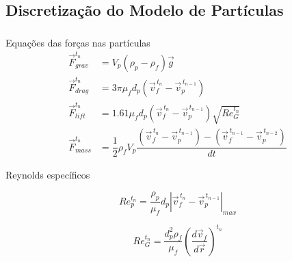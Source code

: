 \documentclass{beamer}
\begin{document}
\subsection*{Discretização do Modelo de Partículas}
\begin{frame}
  \frametitle{\subsecname}
  
  \begin{block}{Equações das forças nas partículas}
      \vspace*{-\baselineskip}\setlength\belowdisplayshortskip{0pt} %
      \begin{align*}
	\vec{F}_{grav}^{t_n} &=  V_p\left(\rho_p -\rho_f \right) \vec{g} \\
	\vec{F}_{drag}^{t_n} &= 3 \pi \mu_f d_p \left(\vec{v}_{f}^{\,t_n} - \vec{v}_{p}^{\,t_{n-1}} \right) \\
	\vec{F}_{lift}^{t_n}\ \ &= 1.61 \mu_f d_p \left(\vec{v}_{f}^{\,t_n} - \vec{v}_{p}^{\,t_{n-1}} \right) \sqrt{{Re}_G^{t_n}} \\
	\vec{F}_{mass}^{t_n} &= \dfrac{1}{2} \rho_f V_p \dfrac{\left(\vec{v}_{f}^{\,t_n} - \vec{v}_{p}^{\,t_{n-1}}\right) -
	\left(\vec{v}_{f}^{\,t_{n-1}} - \vec{v}_{p}^{\,t_{n-2}} \right)}{dt}
      \end{align*}
  \end{block}

  \begin{block}{Reynolds específicos}
    \begin{minipage}{.35\textwidth}
      \vspace*{-\baselineskip}\setlength\belowdisplayshortskip{0pt} %
      \begin{equation*}
	  Re_{p}^{t_n} = \dfrac{\rho_p}{\mu_f} d_{p} \left|\vec{v}_{f}^{\,t_n} - \vec{v}_{p}^{\,t_{n-1}} \right|_{max}
      \end{equation*}
    \end{minipage}
    \hspace{5pt}
    \begin{minipage}{.55\textwidth}
      \begin{equation*}
	  Re_G^{t_n} = \dfrac{d_p^2 \rho_f}{\mu_f} \left( \dfrac{d\vec{v}_f}{d\vec{r}} \right)^{t_n}
      \end{equation*}
    \end{minipage}
  \end{block}
\end{frame}
\end{document}
